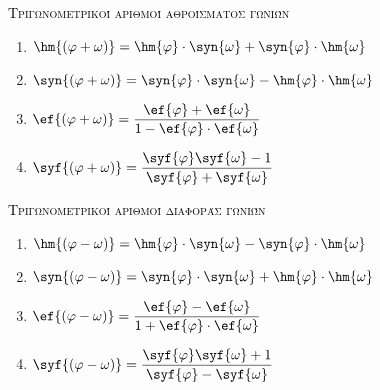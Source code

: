 \documentclass[twoside,11pt,a4paper,openany]{book}
\def\xrwma{black}
\begin{document}
\begin{center}
{\large \scfont\scshape{\textcolor{\xrwma}{Τριγωνομετρικοί αριθμοί αθροίσματος γωνιών}}}
\end{center}
\begin{multicols}{2}
\begin{enumerate}[itemsep=0mm]
\item $ \hm{\left( \varphi+\omega\right) }=\hm{\varphi}\cdot\syn{\omega}+\syn{\varphi}\cdot\hm{\omega} $
\item $ \syn {\left( \varphi+\omega\right) }=\syn{\varphi}\cdot\syn{\omega}-\hm{\varphi}\cdot\hm{\omega} $
\item $ \ef{\left( \varphi+\omega\right) }=\dfrac{\ef{\varphi}+\ef{\omega}}{1-\ef{\varphi}\cdot\ef{\omega}} $
\item $ \syf{\left( \varphi+\omega\right) }=\dfrac{\syf{\varphi}\syf{\omega}-1}{\syf{\varphi}+\syf{\omega}} $
\end{enumerate}
\end{multicols}
\begin{center}
{\large \scfont\scshape{\textcolor{\xrwma}{Τριγωνομετρικοί αριθμοί διαφοράς γωνιών}}}
\end{center}
\begin{multicols}{2}
\begin{enumerate}[itemsep=0mm]
\item $ \hm{\left( \varphi-\omega\right) }=\hm{\varphi}\cdot\syn{\omega}-\syn{\varphi}\cdot\hm{\omega} $
\item $ \syn{\left( \varphi-\omega\right) }=\syn{\varphi}\cdot\syn{\omega}+\hm{\varphi}\cdot\hm{\omega} $
\item $ \ef{\left( \varphi-\omega\right) }=\dfrac{\ef{\varphi}-\ef{\omega}}{1+\ef{\varphi}\cdot\ef{\omega}} $
\item $ \syf{\left( \varphi-\omega\right) }=\dfrac{\syf{\varphi}\syf{\omega}+1}{\syf{\varphi}-\syf{\omega}} $
\end{enumerate}
\end{multicols}
\end{document}
